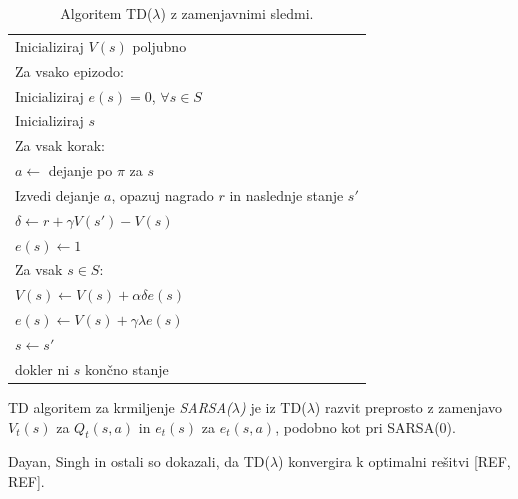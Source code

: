 \documentclass[a4paper, oneside, 12pt]{report}
\begin{document}
\begin{table}[htbp]
\begin{center}
\begin{tabular}{| l |}
\hline
Inicializiraj $V(s)$ poljubno \\
Za vsako epizodo: \\
\quad Inicializiraj $e(s) = 0$, $\forall s \in S$ \\
\quad Inicializiraj $s$ \\
\quad Za vsak korak: \\
\quad \quad $a \gets$ dejanje po $\pi$ za $s$ \\
\quad \quad Izvedi dejanje $a$, opazuj nagrado $r$ in naslednje stanje $s'$ \\
\quad \quad $\delta \gets r + \gamma V(s') - V(s)$ \\
\quad \quad $e(s) \gets 1$ \\
\quad \quad Za vsak $s \in S$: \\
\quad \quad \quad $V(s) \gets V(s) + \alpha \delta e(s)$ \\
\quad \quad \quad $e(s) \gets V(s) + \gamma \lambda e(s)$ \\
\quad \quad $s \gets s'$ \\
\quad dokler ni $s$ končno stanje \\
\hline
\end{tabular}
\end{center}
\caption{Algoritem TD($\lambda$) z zamenjavnimi sledmi.}
\label{table:TDLambda}
\end{table}

TD algoritem za krmiljenje {\em SARSA($\lambda$)} je iz TD($\lambda$) razvit preprosto z zamenjavo $V_t(s)$ za $Q_t(s, a)$ in $e_t(s)$ za $e_t(s,a)$, podobno kot pri SARSA(0).

Dayan, Singh in ostali so dokazali, da TD($\lambda$) konvergira k optimalni rešitvi [REF, REF].
\end{document}
